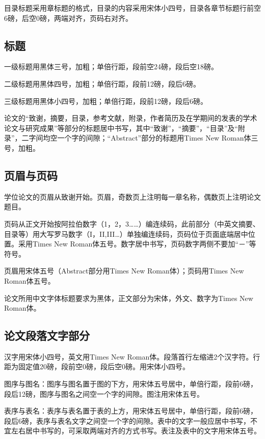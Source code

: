 \documentclass[a4paper,12pt,oneside,openany]{book}
\begin{document}
目录标题采用章标题的格式，目录的内容采用宋体小四号，目录各章节标题行前空6磅，后空0磅，两端对齐，页码右对齐。


\subsection{标题}

一级标题用黑体三号，加粗；单倍行距，段前空24磅，段后空18磅。

二级标题用黑体四号，加粗；单倍行距，段前12磅，段后6磅。

三级标题用黑体小四号，加粗；单倍行距，段前12磅，段后6磅。

论文的“致谢，摘要，目录，参考文献，附录，作者简历及在学期间的发表的学术论文与研究成果”等部分的标题居中书写，其中“致谢”，“摘要”，“目录”及“附录”，二字间均空一个字的间隙；“Abstract”部分的标题用Times
New Roman体三号，加粗。 


\subsection{页眉与页码}

学位论文的页眉从致谢开始。页眉，奇数页上注明每一章名称，偶数页上注明论文题目。

页码从正文开始按阿拉伯数字（1，2，3……）编连续码，此前部分（中英文摘要、目录等）用大写罗马数字（I，II,III…）单独编连续码，页码位于页面底端居中位置。采用Times
New Roman体五号。数字居中书写，页码数字两侧不要加“－”等符号。

页眉用宋体五号（Abstract部分用Times New Roman体）；页码用Times New Roman体五号。

论文所用中文字体标题要求为黑体，正文部分为宋体，外文、数字为Times New Roman体。 


\subsection{论文段落文字部分}

汉字用宋体小四号，英文用Times New Roman体。段落首行左缩进2个汉字符。行距为固定值20磅，段前空0磅，段后空0磅。用宋体小四号。

图序与图名：图序与图名置于图的下方，用宋体五号居中，单倍行距，段前6磅，段后12磅，图序与图名之间空一个字的间隙。图注用宋体五号。

表序与表名：表序与表名置于表的上方，用宋体五号居中，单倍行距，段前6磅，段后6磅，表序与表名文字之间空一个字的间隙。表中的文字一般应居中书写，不宜左右居中书写的，可采取两端对齐的方式书写。表注及表中的文字用宋体五号。
\end{document}
